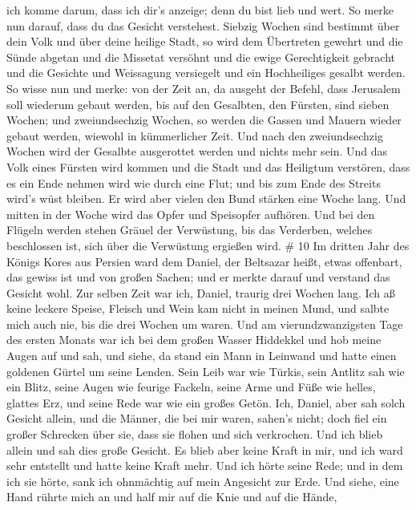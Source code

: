 ich komme darum, dass ich dir's anzeige; denn du bist lieb und wert. So
merke nun darauf, dass du das Gesicht verstehest.  Siebzig
Wochen sind bestimmt über dein Volk und über deine heilige Stadt, so
wird dem Übertreten gewehrt und die Sünde abgetan und die Missetat
versöhnt und die ewige Gerechtigkeit gebracht und die Gesichte und
Weissagung versiegelt und ein Hochheiliges gesalbt werden. 
So wisse nun und merke: von der Zeit an, da ausgeht der Befehl, dass
Jerusalem soll wiederum gebaut werden, bis auf den Gesalbten, den
Fürsten, sind sieben Wochen; und zweiundsechzig Wochen, so werden die
Gassen und Mauern wieder gebaut werden, wiewohl in kümmerlicher Zeit.
 Und nach den zweiundsechzig Wochen wird der Gesalbte
ausgerottet werden und nichts mehr sein. Und das Volk eines Fürsten wird
kommen und die Stadt und das Heiligtum verstören, dass es ein Ende
nehmen wird wie durch eine Flut; und bis zum Ende des Streits wird's
wüst bleiben.  Er wird aber vielen den Bund stärken eine
Woche lang. Und mitten in der Woche wird das Opfer und Speisopfer
aufhören. Und bei den Flügeln werden stehen Gräuel der Verwüstung, bis
das Verderben, welches beschlossen ist, sich über die Verwüstung
ergießen wird. \# 10  Im dritten Jahr des Königs Kores aus
Persien ward dem Daniel, der Beltsazar heißt, etwas offenbart, das
gewiss ist und von großen Sachen; und er merkte darauf und verstand das
Gesicht wohl.  Zur selben Zeit war ich, Daniel, traurig drei
Wochen lang.  Ich aß keine leckere Speise, Fleisch und Wein
kam nicht in meinen Mund, und salbte mich auch nie, bis die drei Wochen
um waren.  Und am vierundzwanzigsten Tage des ersten Monats
war ich bei dem großen Wasser Hiddekkel  und hob meine Augen
auf und sah, und siehe, da stand ein Mann in Leinwand und hatte einen
goldenen Gürtel um seine Lenden.  Sein Leib war wie Türkis,
sein Antlitz sah wie ein Blitz, seine Augen wie feurige Fackeln, seine
Arme und Füße wie helles, glattes Erz, und seine Rede war wie ein großes
Getön.  Ich, Daniel, aber sah solch Gesicht allein, und die
Männer, die bei mir waren, sahen's nicht; doch fiel ein großer Schrecken
über sie, dass sie flohen und sich verkrochen.  Und ich
blieb allein und sah dies große Gesicht. Es blieb aber keine Kraft in
mir, und ich ward sehr entstellt und hatte keine Kraft mehr.
 Und ich hörte seine Rede; und in dem ich sie hörte, sank
ich ohnmächtig auf mein Angesicht zur Erde.  Und siehe,
eine Hand rührte mich an und half mir auf die Knie und auf die Hände,
